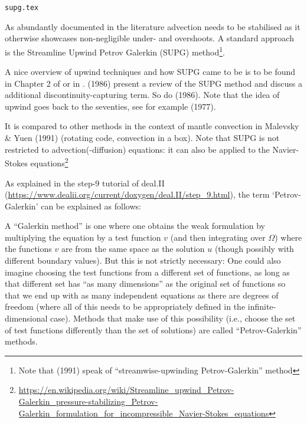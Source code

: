 \begin{flushright} {\tiny {\color{gray} \tt supg.tex}} \end{flushright}

As abundantly documented in the literature advection needs to be stabilised
as it otherwise showcases non-negligible under- and overshoots.
A standard approach is the Streamline Upwind Petrov Galerkin (SUPG) 
method\footnote{Note that \textcite{mayu91} (1991) speak of ``streamwise-upwinding Petrov-Galerkin'' method}.

A nice overview of upwind techniques and how SUPG came to be is to be found in Chapter 
2 of \textcite{dohu03} or in \textcite{brhu82}.
\textcite{humm86} (1986) present a review of the SUPG method 
and discuss a additional discontinuity-capturing term. 
So do \textcite{tepa86} (1986).
Note that the idea of upwind goes back to the seventies, see for example 
\textcite{hehz77} (1977).

It is compared to other methods in the context of mantle convection in 
Malevsky \& Yuen (1991) \cite{mayu91} (rotating code, convection in a box). 
Note that SUPG is not restricted to advection(-diffusion) equations: it can also
be applied to the Navier-Stokes equations\footnote{\url{https://en.wikipedia.org/wiki/Streamline_upwind_Petrov-Galerkin_pressure-stabilizing_Petrov-Galerkin_formulation_for_incompressible_Navier-Stokes_equations}}

As explained in the step-9 tutorial of deal.II (\url{https://www.dealii.org/current/doxygen/deal.II/step_9.html}), the term `Petrov-Galerkin' can be explained as follows: 
\begin{displayquote}
{\color{darkgray}
A ``Galerkin method'' is one where one obtains the weak formulation by multiplying the equation by a test function $v$ (and then integrating over $\Omega$) where the functions $v$ are from the same space as the solution $u$ (though possibly with different boundary values). But this is not strictly necessary: One could also imagine choosing the test functions from a different set of functions, as long as that different set has ``as many dimensions'' as the original set of functions so that we end up with as many independent equations as there are degrees of freedom (where all of this needs to be appropriately defined in the infinite-dimensional case). Methods that make use of this possibility (i.e., choose the set of test functions differently than the set of solutions) are called ``Petrov-Galerkin'' methods. }
\end{displayquote}

